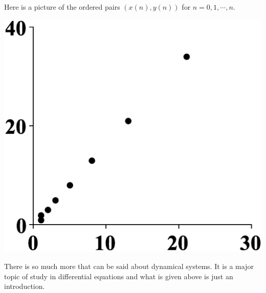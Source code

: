Here is a picture of
the ordered pairs $\left( x\left( n\right) ,y\left( n\right) \right) $ for $
n=0,1,\cdots ,n$.

\begin{center}
\includegraphics[bb=0 0 800 800,scale=.2]{figures/fibonacci.eps}
\end{center}

There is so much more that can be said about dynamical systems. It is a
major topic of study in differential equations and what is given above is
just an introduction.